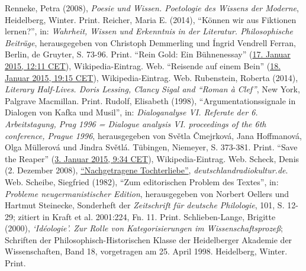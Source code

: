 \documentclass[fontsize=12pt]{scrartcl}
\begin{document}
{{{{\begin{thebibliography}
	Renneke, Petra (2008), \textit{Poesie und Wissen. Poetologie des Wissens der Moderne}, Heidelberg, Winter. Print.
	Reicher, Maria E. (2014), "`K\"onnen wir aus Fiktionen lernen?"', in: \textit{Wahrheit, Wissen und Erkenntnis in der Li\-te\-ra\-tur. Philosophische Beitr\"age}, he\-rausgegeben von Christoph Demmerling und \'{I}ngrid Vendrell Ferran, Berlin, de Gruyter, S. 73-96. Print.
	"`Rein Gold: Ein B\"uhnenessay"' (\href{https://de.wikipedia.org/w/index.php?title=Rein_Gold:_Ein_B\%C3\%BChnenessay\&oldid=137866703}{17. Januar 2015, 12:11 CET}), Wi\-ki\-pe\-dia-Eintrag. Web.
	"`Reisende auf einem Bein"' (\href{https://de.wikipedia.org/w/index.php?title=Reisende_auf_einem_Bein\&oldid=137915300}{18. Januar 2015, 19:15 CET}), Wi\-ki\-pe\-dia-Eintrag. Web.
	Rubenstein, Roberta (2014), \textit{Literary Half-Lives. Doris Lessing, Clancy Sigal and "`Roman \`{a} Clef"'}, New York, Palgrave Macmillan. Print.
	Rudolf, Elisabeth (1998), "`Argumentationssignale in Dialogen von Kafka und Musil"', in: \textit{Dialogana\-lyse VI. Referate der 6. Arbeitstagung, Prag 1996 = Dialogue ana\-lysis VI. proceedings of the 6th conference, Prague 1996}, he\-rausgegeben von Sv\v{e}tla \v{C}mejrkov\'{a}, Jana Hoffmanov\'{a}, Olga M\"ullerov\'{a} und Jindra Sv\v{e}tl\'{a}. T\"ubingen, Niemeyer, S. 373-381. Print.
	"`Save the Reaper"' (\href{https://de.wikipedia.org/w/index.php?title=Save_the_Reaper\&oldid=137361185}{3. Januar 2015, 9:34 CET}), Wi\-ki\-pe\-dia-Eintrag. Web.
	Scheck, Denis (2. Dezember 2008), \href{http://www.deutschlandradiokultur.de/nachgetragene-tochterliebe.950.de.html?dram:article_id=136885}{"`Nachgetragene Tochterliebe"'}, \textit{deutschlandradiokultur.de}. Web.
	Scheibe, Siegfried (1982), "`Zum editorischen Pro\-blem des Textes"', in: \textit{Pro\-ble\-me neugermanistischer Edition}, he\-rausgegeben von Norbert Oellers und Hartmut Steinecke, Sonderheft der \textit{Zeitschrift f\"ur deutsche Philologie}, 101, S. 12-29; zitiert in Kraft et al. 2001:224, Fn. 11. Print.
	Schlieben-Lange, Brigitte (2000), \textit{`Id\'{e}ologie'. Zur Rolle von Kategorisierungen im Wissenschaftsproze{\ss}}; Schriften der Philosophisch-Historischen Klasse der Heidelberger Akade\-mie der Wissenschaften, Band 18, vorgetragen am 25. April 1998. Heidelberg, Winter. Print.

\end{thebibliography}}}}}
\end{document}
